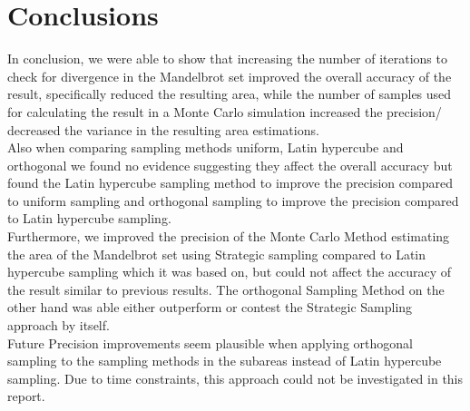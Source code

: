 \documentclass{uva-inf-article}
\begin{document}
\section{Conclusions}
In conclusion, we were able to show that increasing the number of iterations to check for divergence in the Mandelbrot set improved the overall accuracy of the result, specifically reduced the resulting area, while the number of samples used for calculating the result in a Monte Carlo simulation increased the precision/ decreased the variance in the resulting area estimations.\\
Also when comparing sampling methods uniform, Latin hypercube and orthogonal we found no evidence suggesting they affect the overall accuracy but found the Latin hypercube sampling method to improve the precision compared to uniform sampling and orthogonal sampling to improve the precision compared to Latin hypercube sampling.\\
Furthermore, we improved the precision of the Monte Carlo Method estimating the area of the Mandelbrot set using Strategic sampling compared to Latin hypercube sampling which it was based on, but could not affect the accuracy of the result similar to previous results.
The orthogonal Sampling Method on the other hand was able either outperform or contest the Strategic Sampling approach by itself. \\
Future Precision improvements seem plausible when applying orthogonal sampling to the sampling methods in the subareas instead of Latin hypercube sampling. Due to time constraints, this approach could not be investigated in this report.

\clearpage
\printbibliography



\end{document}
